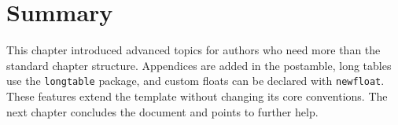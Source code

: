 \section{Summary}\label{ch6sec:advanced-summary}

This chapter introduced advanced topics for authors who need more than the standard chapter structure. Appendices are added in the postamble, long tables use the \texttt{longtable} package, and custom floats can be declared with \texttt{newfloat}. These features extend the template without changing its core conventions. The next chapter concludes the document and points to further help.
